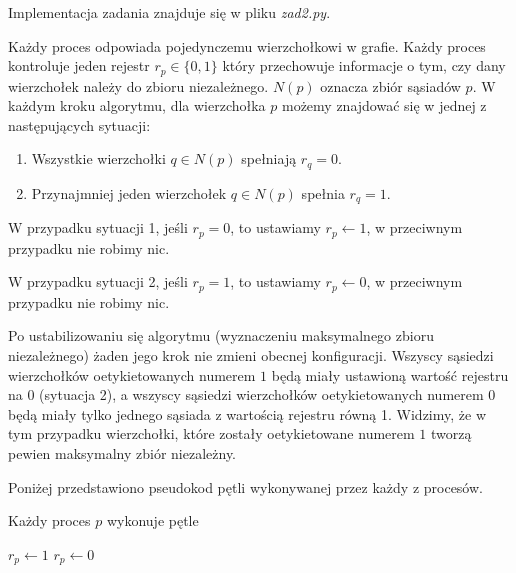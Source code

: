 \documentclass{article}
\newenvironment{pseudokod}[1][htb]{
	\renewcommand{\algorithmcfname}{}
	\begin{algorithm}[#1]%
	}{
\end{algorithm}
}
\begin{document}
    Implementacja zadania znajduje się w pliku \textit{zad2.py}.

    Każdy proces odpowiada pojedynczemu wierzchołkowi w grafie. Każdy proces kontroluje jeden rejestr $r_p \in \{0, 1\}$ który przechowuje 
    informacje o tym, czy dany wierzchołek należy do zbioru niezależnego. $N(p)$ oznacza zbiór sąsiadów $p$. 
    W każdym kroku algorytmu, dla wierzchołka $p$ możemy znajdować się w jednej z następujących sytuacji:
    \begin{enumerate}
        \item Wszystkie wierzchołki $q \in N(p)$ spełniają $r_q = 0$.
        \item Przynajmniej jeden wierzchołek $q \in N(p)$ spełnia $r_q = 1$.
    \end{enumerate}

    W przypadku sytuacji 1, jeśli $r_p = 0$, to ustawiamy $r_p \gets 1$, w przeciwnym przypadku nie robimy nic.

    W przypadku sytuacji 2, jeśli $r_p = 1$, to ustawiamy $r_p \gets 0$, w przeciwnym przypadku nie robimy nic.
    
    Po ustabilizowaniu się algorytmu (wyznaczeniu maksymalnego zbioru niezależnego) żaden jego krok nie zmieni obecnej konfiguracji. 
    Wszyscy sąsiedzi wierzchołków oetykietowanych numerem $1$ będą miały ustawioną wartość rejestru na 0 (sytuacja 2), a wszyscy sąsiedzi 
    wierzchołków oetykietowanych numerem $0$ będą miały tylko jednego sąsiada z wartością rejestru równą 1. Widzimy, że w tym przypadku 
    wierzchołki, które zostały oetykietowane numerem $1$ tworzą pewien maksymalny zbiór niezależny.

    Poniżej przedstawiono pseudokod pętli wykonywanej przez każdy z procesów.

    \begin{pseudokod}[H]
        \caption{Każdy proces $p$ wykonuje pętle}
         {
            \BlankLine
             {
                $r_p \gets 1$\;
            }
             {
                $r_p \gets 0$\;
            }
        }
    \end{pseudokod}
\end{document}
